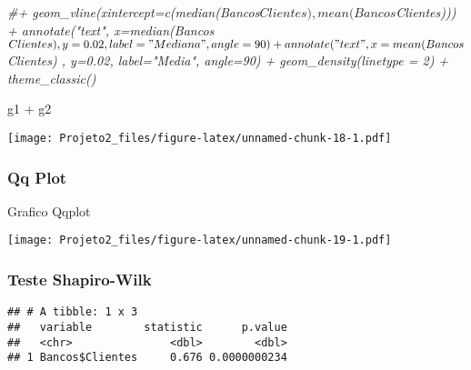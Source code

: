 \documentclass[
]{article}
\newenvironment{Shaded}{\begin{snugshade}}{\end{snugshade}}
\newcommand{\AttributeTok}[1]{\textcolor[rgb]{0.77,0.63,0.00}{#1}}
\newcommand{\CommentTok}[1]{\textcolor[rgb]{0.56,0.35,0.01}{\textit{#1}}}
\newcommand{\FunctionTok}[1]{\textcolor[rgb]{0.00,0.00,0.00}{#1}}
\newcommand{\NormalTok}[1]{#1}
\newcommand{\SpecialCharTok}[1]{\textcolor[rgb]{0.00,0.00,0.00}{#1}}
\newcommand{\StringTok}[1]{\textcolor[rgb]{0.31,0.60,0.02}{#1}}
\begin{document}
\begin{Shaded}
\begin{Highlighting}[]
\CommentTok{\#+ geom\_vline(xintercept=c(median(Bancos$Clientes), mean(Bancos$Clientes))) + annotate("text", x=median(Bancos$Clientes) , y=0.02, label="Mediana", angle=90) + annotate("text", x=mean(Bancos$Clientes) , y=0.02, label="Media", angle=90) + geom\_density(linetype = 2) + theme\_classic()}

\NormalTok{g1 }\SpecialCharTok{+}\NormalTok{ g2}
\end{Highlighting}
\end{Shaded}

\texttt{[image: Projeto2\_files/figure-latex/unnamed-chunk-18-1.pdf]}

\hypertarget{qq-plot-3}{%
\subsubsection{Qq Plot}\label{qq-plot-3}}

Grafico Qqplot

\begin{Shaded}
\end{Shaded}

\texttt{[image: Projeto2\_files/figure-latex/unnamed-chunk-19-1.pdf]}

\hypertarget{teste-shapiro-wilk-3}{%
\subsubsection{Teste Shapiro-Wilk}\label{teste-shapiro-wilk-3}}

\begin{Shaded}
\end{Shaded}

\begin{verbatim}
## # A tibble: 1 x 3
##   variable        statistic      p.value
##   <chr>               <dbl>        <dbl>
## 1 Bancos$Clientes     0.676 0.0000000234
\end{verbatim}
\end{document}
